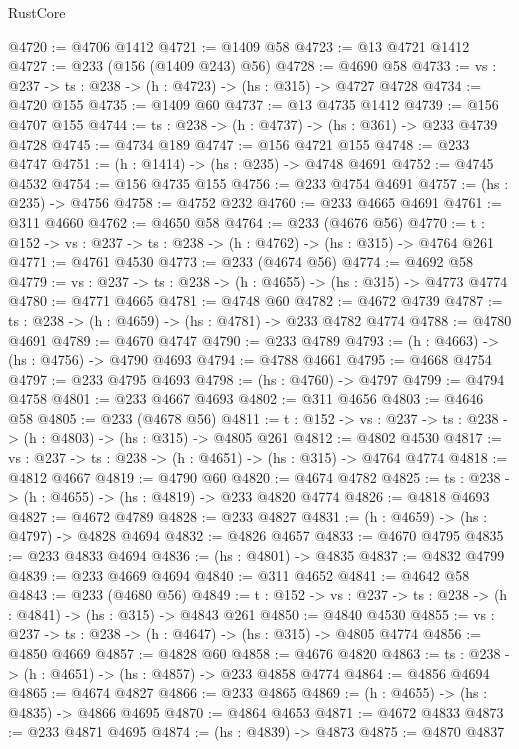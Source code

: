 \begin{lexlean}{RustCore}
\begin{coremodule}
@4720 := @4706 @1412
@4721 := @1409 @58
@4723 := @13 @4721 @1412
@4727 := @233 (@156 (@1409 @243) @56)
@4728 := @4690 @58
@4733 := {vs : @237} -> {ts : @238} -> (h : @4723) -> (hs : @315) -> @4727 @4728
@4734 := @4720 @155
@4735 := @1409 @60
@4737 := @13 @4735 @1412
@4739 := @156 @4707 @155
@4744 := {ts : @238} -> (h : @4737) -> (hs : @361) -> @233 @4739 @4728
@4745 := @4734 @189
@4747 := @156 @4721 @155
@4748 := @233 @4747
@4751 := (h : @1414) -> (hs : @235) -> @4748 @4691
@4752 := @4745 @4532
@4754 := @156 @4735 @155
@4756 := @233 @4754 @4691
@4757 := (hs : @235) -> @4756
@4758 := @4752 @232
@4760 := @233 @4665 @4691
@4761 := @311 @4660
@4762 := @4650 @58
@4764 := @233 (@4676 @56)
@4770 := {t : @152} -> {vs : @237} -> {ts : @238} -> (h : @4762) -> (hs : @315) -> @4764 @261
@4771 := @4761 @4530
@4773 := @233 (@4674 @56)
@4774 := @4692 @58
@4779 := {vs : @237} -> {ts : @238} -> (h : @4655) -> (hs : @315) -> @4773 @4774
@4780 := @4771 @4665
@4781 := @4748 @60
@4782 := @4672 @4739
@4787 := {ts : @238} -> (h : @4659) -> (hs : @4781) -> @233 @4782 @4774
@4788 := @4780 @4691
@4789 := @4670 @4747
@4790 := @233 @4789
@4793 := (h : @4663) -> (hs : @4756) -> @4790 @4693
@4794 := @4788 @4661
@4795 := @4668 @4754
@4797 := @233 @4795 @4693
@4798 := (hs : @4760) -> @4797
@4799 := @4794 @4758
@4801 := @233 @4667 @4693
@4802 := @311 @4656
@4803 := @4646 @58
@4805 := @233 (@4678 @56)
@4811 := {t : @152} -> {vs : @237} -> {ts : @238} -> (h : @4803) -> (hs : @315) -> @4805 @261
@4812 := @4802 @4530
@4817 := {vs : @237} -> {ts : @238} -> (h : @4651) -> (hs : @315) -> @4764 @4774
@4818 := @4812 @4667
@4819 := @4790 @60
@4820 := @4674 @4782
@4825 := {ts : @238} -> (h : @4655) -> (hs : @4819) -> @233 @4820 @4774
@4826 := @4818 @4693
@4827 := @4672 @4789
@4828 := @233 @4827
@4831 := (h : @4659) -> (hs : @4797) -> @4828 @4694
@4832 := @4826 @4657
@4833 := @4670 @4795
@4835 := @233 @4833 @4694
@4836 := (hs : @4801) -> @4835
@4837 := @4832 @4799
@4839 := @233 @4669 @4694
@4840 := @311 @4652
@4841 := @4642 @58
@4843 := @233 (@4680 @56)
@4849 := {t : @152} -> {vs : @237} -> {ts : @238} -> (h : @4841) -> (hs : @315) -> @4843 @261
@4850 := @4840 @4530
@4855 := {vs : @237} -> {ts : @238} -> (h : @4647) -> (hs : @315) -> @4805 @4774
@4856 := @4850 @4669
@4857 := @4828 @60
@4858 := @4676 @4820
@4863 := {ts : @238} -> (h : @4651) -> (hs : @4857) -> @233 @4858 @4774
@4864 := @4856 @4694
@4865 := @4674 @4827
@4866 := @233 @4865
@4869 := (h : @4655) -> (hs : @4835) -> @4866 @4695
@4870 := @4864 @4653
@4871 := @4672 @4833
@4873 := @233 @4871 @4695
@4874 := (hs : @4839) -> @4873
@4875 := @4870 @4837

\end{coremodule}
\end{lexlean}
